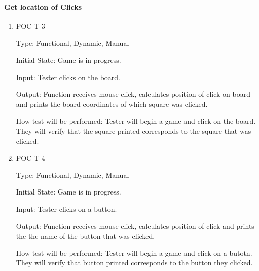 \documentclass[12pt, titlepage]{article}
\begin{document}
\paragraph{Get location of Clicks}
\begin{enumerate}
    \item{POC-T-3}

    Type: Functional, Dynamic, Manual

    Initial State: Game is in progress.

    Input: Tester clicks on the board.
	
    Output: Function receives mouse click, calculates position of click on board and prints the board coordinates of which square was clicked.
	
    How test will be performed: Tester will begin a game and click on the board. They will verify that the square printed corresponds to the square that was clicked.
    \item{POC-T-4}

    Type: Functional, Dynamic, Manual

    Initial State: Game is in progress.

    Input: Tester clicks on a button.
	
    Output: Function receives mouse click, calculates position of click and prints the the name of the button that was clicked.
	
    How test will be performed: Tester will begin a game and click on a butotn. They will verify that button printed corresponds to the button they clicked.
\end{enumerate}
\end{document}
